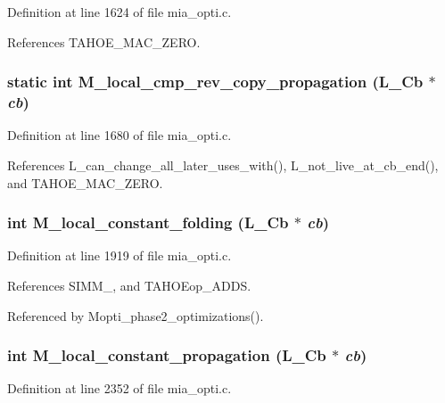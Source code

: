 Definition at line 1624 of file mia\_\-opti.c.

References TAHOE\_\-MAC\_\-ZERO.
\subsubsection{\setlength{\rightskip}{0pt plus 5cm}static int M\_\-local\_\-cmp\_\-rev\_\-copy\_\-propagation (L\_\-Cb $\ast$ {\em cb})\hspace{0.3cm}{\tt  [static]}}\label{mia__opti_8c_e8bc412e2658f0d8d627b02e5a720f4c}




Definition at line 1680 of file mia\_\-opti.c.

References L\_\-can\_\-change\_\-all\_\-later\_\-uses\_\-with(), L\_\-not\_\-live\_\-at\_\-cb\_\-end(), and TAHOE\_\-MAC\_\-ZERO.
\subsubsection{\setlength{\rightskip}{0pt plus 5cm}int M\_\-local\_\-constant\_\-folding (L\_\-Cb $\ast$ {\em cb})}\label{mia__opti_8c_2f87ad062e11eb5db1b41aebeeb33243}




Definition at line 1919 of file mia\_\-opti.c.

References SIMM\_, and TAHOEop\_\-ADDS.

Referenced by Mopti\_\-phase2\_\-optimizations().
\subsubsection{\setlength{\rightskip}{0pt plus 5cm}int M\_\-local\_\-constant\_\-propagation (L\_\-Cb $\ast$ {\em cb})}\label{mia__opti_8c_3c620088a0f7a670d6e77a6563761dc4}




Definition at line 2352 of file mia\_\-opti.c.

